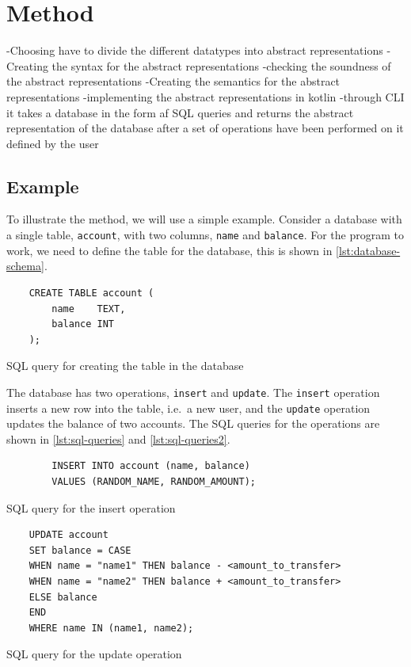\section{Method}
\label{sec:method}
-Choosing have to divide the different datatypes into abstract representations
-Creating the syntax for the abstract representations
-checking the soundness of the abstract representations
-Creating the semantics for the abstract representations
-implementing the abstract representations in kotlin
-through CLI it takes a database in the form af SQL queries and returns the abstract representation of the database after a set of operations have been performed on it defined by the user

\subsection{Example}\label{subsec:example}
To illustrate the method, we will use a simple example.
Consider a database with a single table, \texttt{account}, with two columns, \texttt{name} and \texttt{balance}.
For the program to work, we need to define the table for the database, this is shown in \autoref{lst:database-schema}.


\begin{listing}[htb!]
    \begin{verbatim}
    CREATE TABLE account (
        name    TEXT,
        balance INT
    );
    \end{verbatim}
    \caption{SQL query for creating the table in the database}
    \label{lst:database-schema}
\end{listing}


The database has two operations, \texttt{insert} and \texttt{update}.
The \texttt{insert} operation inserts a new row into the table, i.e.\ a new user, and the \texttt{update} operation updates the balance of two accounts.
The SQL queries for the operations are shown in \autoref{lst:sql-queries} and \autoref{lst:sql-queries2}.


\begin{listing}[htb!]
    \begin{verbatim}
        INSERT INTO account (name, balance)
        VALUES (RANDOM_NAME, RANDOM_AMOUNT);
    \end{verbatim}
    \caption{SQL query for the insert operation}
    \label{lst:sql-queries}
\end{listing}


\begin{listing}[htb!]
    \begin{verbatim}
    UPDATE account
    SET balance = CASE
    WHEN name = "name1" THEN balance - <amount_to_transfer>
    WHEN name = "name2" THEN balance + <amount_to_transfer>
    ELSE balance
    END
    WHERE name IN (name1, name2);
    \end{verbatim}
    \caption{SQL query for the update operation}
    \label{lst:sql-queries2}
\end{listing}


